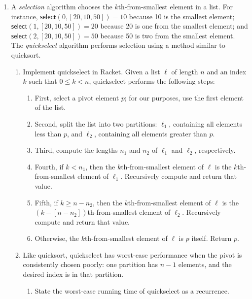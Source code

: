 \documentclass{article}
\begin{document}
\begin{enumerate}

  \pagebreak[2]
\item
  A \emph{selection} algorithm chooses the \(k\)th-from-smallest element in a
  list.  For instance, \(\mathsf{select}(0,[20,10,50])=10\) because 10 is the
  smallest element; \(\mathsf{select}(1,[20,10,50])=20\) because 20 is one from
  the smallest element; and \(\mathsf{select}(2,[20,10,50])=50\) because 50 is
  two from the smallest element.  The \emph{quickselect} algorithm performs
  selection using a method similar to quicksort.
  \begin{enumerate}
  \item
    Implement quickselect in Racket.  Given a list \(\ell\) of length \(n\) and
    an index \(k\) such that \(0 \leq k < n\), quickselect performs the
    following steps:
    \begin{enumerate}
    \item
      First, select a pivot element \(p\); for our purposes, use the first
      element of the list.
    \item
      Second, split the list into two partitions: \(\ell_1\), containing all
      elements less than \(p\), and \(\ell_2\), containing all elements greater
      than \(p\).
    \item
      Third, compute the lengths \(n_1\) and \(n_2\) of \(\ell_1\) and
      \(\ell_2\), respectively.
    \item
      Fourth, if \(k < n_1\), then the \(k\)th-from-smallest element of \(\ell\)
      is the \(k\)th-from-smallest element of \(\ell_1\).  Recursively compute
      and return that value.
    \item
      Fifth, if \(k \geq n - n_2\), then the \(k\)th-from-smallest element of
      \(\ell\) is the \((k - [n - n_2])\)th-from-smallest element of \(\ell_2\).
      Recursively compute and return that value.
    \item
      Otherwise, the \(k\)th-from-smallest element of \(\ell\) is \(p\) itself.
      Return \(p\).
    \end{enumerate}
  \item
    Like quicksort, quickselect has worst-case performance when the pivot is
    consistently chosen poorly: one partition has \(n-1\) elements, and the
    desired index is in that partition.
    \begin{enumerate}
    \item State the worst-case running time of quickselect as a recurrence.

\end{enumerate}
\end{enumerate}
\end{enumerate}
\end{document}
